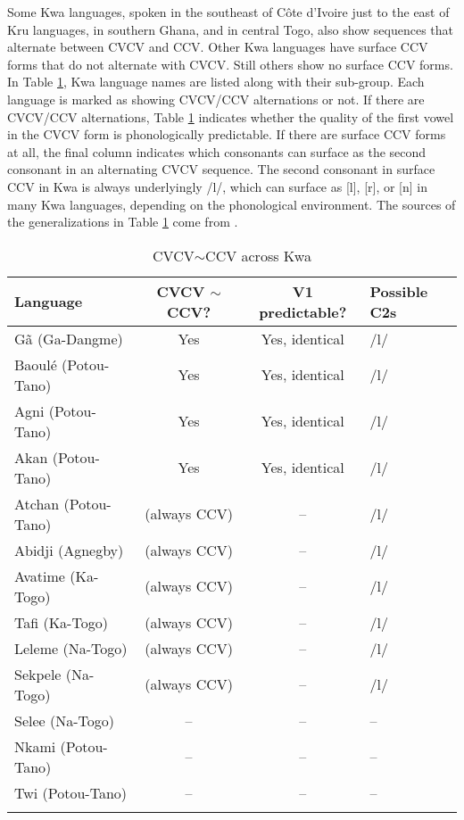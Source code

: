 \documentclass[output=paper,colorlinks,citecolor=brown]{langscibook}
\begin{document}
Some Kwa languages, spoken in the southeast of Côte d'Ivoire just to the east of Kru languages, in southern Ghana, and in central Togo, also show sequences that alternate between CVCV and CCV. Other Kwa languages have surface CCV forms that do not alternate with CVCV. Still others show no surface CCV forms. In Table \ref{kwacvcv}, Kwa language names are listed along with their sub-group. Each language is marked as showing CVCV\slash CCV alternations or not. If there are CVCV\slash CCV alternations, Table \ref{kwacvcv} indicates whether the quality of the first vowel in the CVCV form is phonologically predictable. If there are surface CCV forms at all, the final column indicates which consonants can surface as the second consonant in an alternating CVCV sequence. The second consonant in surface CCV in Kwa is always underlyingly /l/, which can surface as [l], [r], or [n] in many Kwa languages, depending on the phonological environment. The sources of the generalizations in Table \ref{kwacvcv} come from \citet{Westermann:1930, Hyman:1972, Allan:1973, LeSaout:1974, Bergman:1981, BoleRichard:1983, Dolphyne:1988, Schang:1995, Lenaka:1999, Leben:2002, Leben:2003, Ahua:2004, Bobuafor:2004, Hager:2014, VanPutten:2014, Delalorm:2016, Asante:2017, Paster:2010, Agbetsoamedo:2014, Abunya:2018}.

\begin{table}
\caption{CVCV$\sim$CCV across Kwa}
\label{kwacvcv}
\begin{tabularx}{\textwidth}{Xccl}
	\lsptoprule
	Language & CVCV $\sim$ CCV? & V1 predictable? & Possible C2s\\
	\midrule
    Gã (Ga-Dangme) & Yes & Yes, identical & /l/\\
    Baoulé  (Potou-Tano) & Yes & Yes, identical & /l/ \\
	Agni (Potou-Tano) & Yes & Yes, identical & /l/\\
	Akan (Potou-Tano)  & Yes & Yes, identical & /l/\\
	Atchan (Potou-Tano) & (always CCV) & -- & /l/\\
	Abidji (Agnegby) & (always CCV) & -- & /l/\\
	Avatime (Ka-Togo) & (always CCV) & -- & /l/\\
	Tafi (Ka-Togo) & (always CCV) & -- & /l/\\
	Leleme (Na-Togo) & (always CCV) & -- & /l/\\
	Sekpele (Na-Togo) & (always CCV) & -- & /l/\\
	Selee (Na-Togo) & -- & -- & --\\
	Nkami (Potou-Tano) & -- & -- & --\\
	Twi (Potou-Tano) & -- & -- & --\\
	\lspbottomrule
	\end{tabularx}
\end{table}
\end{document}
